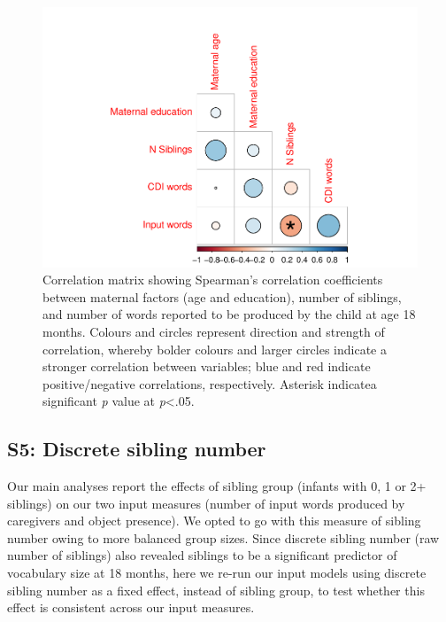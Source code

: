 \documentclass[
  man,mask,floatsintext]{apa6}
\begin{document}
\begin{figure}
\centering
\includegraphics{SiblingsStudy_SupplementaryData-anon-revisions_files/figure-latex/Figure-correlations-1.pdf}
\caption{\label{fig:Figure-correlations}Correlation matrix showing Spearman's correlation coefficients between maternal factors (age and education), number of siblings, and number of words reported to be produced by the child at age 18 months. Colours and circles represent direction and strength of correlation, whereby bolder colours and larger circles indicate a stronger correlation between variables; blue and red indicate positive/negative correlations, respectively. Asterisk indicatea significant \emph{p} value at \emph{p}\textless.05.}
\end{figure}

\newpage

\hypertarget{s5-discrete-sibling-number}{%
\subsection{S5: Discrete sibling number}\label{s5-discrete-sibling-number}}

Our main analyses report the effects of sibling group (infants with 0, 1 or 2+ siblings) on our two input measures (number of input words produced by caregivers and object presence). We opted to go with this measure of sibling number owing to more balanced group sizes. Since discrete sibling number (raw number of siblings) also revealed siblings to be a significant predictor of vocabulary size at 18 months, here we re-run our input models using discrete sibling number as a fixed effect, instead of sibling group, to test whether this effect is consistent across our input measures.
\end{document}
